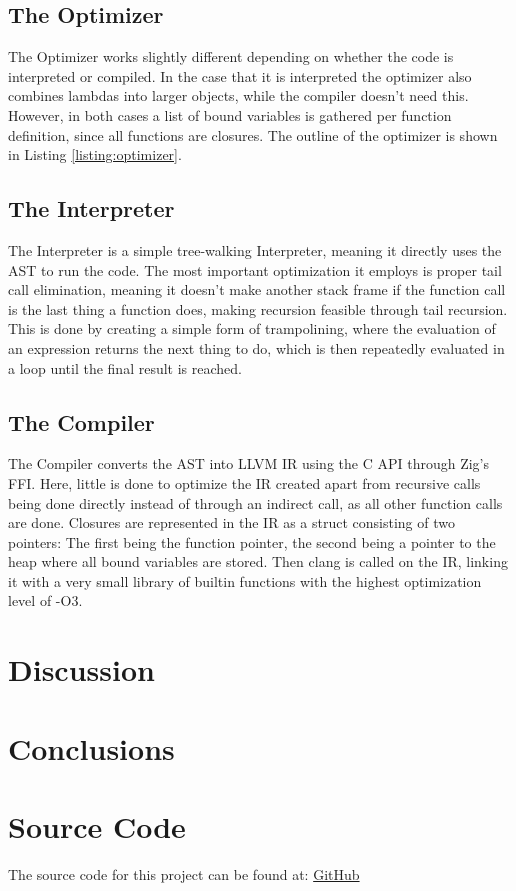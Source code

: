 \documentclass[12pt]{article}
\begin{document}
\subsection{The Optimizer}


The Optimizer works slightly different depending on whether
the code is interpreted or compiled. In the case that it is interpreted
the optimizer also combines lambdas into larger objects,
while the compiler doesn't need this. However, in both cases
a list of bound variables is gathered per function definition,
since all functions are closures.
The outline of the optimizer is shown in Listing \ref{listing:optimizer}.

\subsection{The Interpreter}
The Interpreter is a simple tree-walking Interpreter,
meaning it directly uses the AST to run the code.
The most important optimization it employs is proper tail call elimination,
meaning it doesn't make another stack frame if the function call is the last
thing a function does, making recursion feasible through
tail recursion. This is done by creating a simple form of trampolining,
where the evaluation of an expression returns the next thing to
do, which is then repeatedly evaluated in a loop until the final result
is reached.

\subsection{The Compiler}
The Compiler converts the AST into LLVM IR using the C API through
Zig's FFI. Here, little is done to optimize the IR created apart
from recursive calls being done directly instead of through an indirect
call, as all other function calls are done.
Closures are represented in the IR as a struct consisting of two pointers:
The first being the function pointer, the second being a pointer to the heap
where all bound variables are stored.
Then clang is called on the IR, linking it with a very small library of builtin
functions with the highest optimization level of -O3.

\section{Discussion}

\section{Conclusions}

\newpage



\listoflistings

\appendix
\section{Source Code}
The source code for this project can be found at: \href{https://github.com/enmiligi/matura-project}{GitHub}
\end{document}
